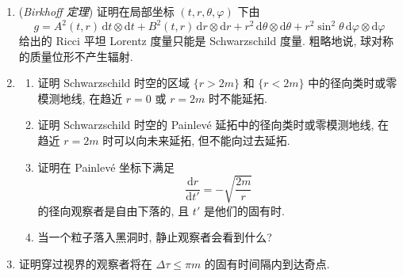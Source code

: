 \begin{RiemannExercise}
\begin{enumerate}[label=(\arabic*),ref=\arabic*,leftmargin=*]
\begin{enumerate}[label=(\alph*),leftmargin=*]
(\textbf{注}: 广义相对论的第一次成功就得益于这一效应, 它解释了\textbf{水星近日点的反常进动} --- 每世纪 43 角秒.)
\item 证明若忽略相对论修正, 则零模测地线满足
\[
  \frac{\mathrm{d}^2u}{\mathrm{d}\varphi^2}+u=0.
\]
证明该方程的解是极坐标下直线的方程
\[
  u=\frac{1}{b}\sin(\varphi-\varphi_0),
\]
其中积分常数 $b>0$ 和 $\varphi_0$ 分别为\textbf{碰撞参数} (到中心的最小距离) 以及直线与 $x$ 轴的夹角.
\item 假定 $mu\ll1$. 通过寻找形如
\[
  u=\frac{1}{b}\left(\sin\varphi+\frac{m}{b}v\right)
\]
的近似解来纳入相对论修正 (为简单起见, 取 $\varphi_0=0$). 证明 $v$ 是方程
\[
  \frac{\mathrm{d}^2v}{\mathrm{d}\varphi^2}+v=3\sin^2\varphi
\]
的近似解, 因而 $u$ 近似由
\[
  u=\frac{1}{b}\left(\sin\varphi
     +\frac{m}{b}\left(\frac{3}{2}+\frac{1}{2}\cos(2\varphi)
                              +\alpha\cos\varphi+\beta\sin\varphi\right)\right)
\]
给出, 其中 $\alpha,\beta$ 为积分常数.
\item 证明对于零模测地线的入射部分 ($\varphi\simeq0$), 近似有
\[
  u=0\iff\varphi=-\frac{m}{b}(2+\alpha).
\]
类似地, 证明对于出射部分 ($\varphi\simeq\pi$), 近似有
\[
  u=0\iff\varphi=\pi+\frac{m}{b}(2-\alpha).
\]
推出沿其路径, $\varphi$ 的改变约为
\[
  \Delta\varphi=\pi+\frac{4m}{b}
\]
弧度, 因此零模测地线向中心偏折约 $\frac{4m}{b}$ 弧度.

(\textbf{注}: 测量太阳引起的这种\textbf{光线偏折} --- $1.75$ 角秒 --- 首次在实验上证实了广义相对论, 使 Einstein 一夜之间成为世界名人.)
\end{enumerate}
\item\label{ex:birkhoff-spherical-vacuum-theorem}
(\emph{Birkhoff 定理}) 证明在局部坐标 $(t,r,\theta,\varphi)$ 下由
\[
  g=A^2(t,r)\,\mathrm{d}t\otimes\mathrm{d}t+B^2(t,r)\,\mathrm{d}r\otimes\mathrm{d}r
     +r^2\,\mathrm{d}\theta\otimes\mathrm{d}\theta
     +r^2\sin^2\theta\,\mathrm{d}\varphi\otimes\mathrm{d}\varphi
\]
给出的 Ricci 平坦 Lorentz 度量只能是 Schwarzschild 度量. 粗略地说, 球对称的质量位形不产生辐射.
\item\label{ex:radial-geodesics-in-schwarzschild}
\begin{enumerate}[label=(\alph*),leftmargin=*]
\item 证明 Schwarzschild 时空的区域 $\{r>2m\}$ 和 $\{r<2m\}$ 中的径向类时或零模测地线, 在趋近 $r=0$ 或 $r=2m$ 时不能延拓.
\item 证明 Schwarzschild 时空的 Painlevé 延拓中的径向类时或零模测地线, 在趋近 $r=2m$ 时可以向未来延拓, 但不能向过去延拓.
\item 证明在 Painlevé 坐标下满足
\[
  \frac{\mathrm{d}r}{\mathrm{d}t'}=-\sqrt{\frac{2m}{r}}
\]
的径向观察者是自由下落的, 且 $t'$ 是他们的固有时.
\item 当一个粒子落入黑洞时, 静止观察者会看到什么?
\end{enumerate}
\item\label{ex:proper-time-from-horizon-to-singularity}
证明穿过视界的观察者将在 $\Delta\tau\leq\pi m$ 的固有时间隔内到达奇点.
\end{enumerate}
\end{RiemannExercise}
